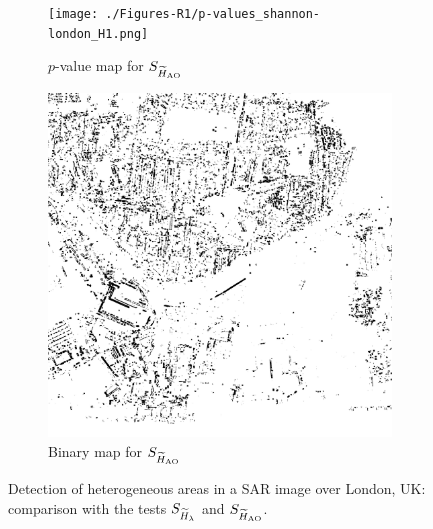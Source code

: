 \documentclass[
  lettersize  journal,
]{IEEEtran}%
\providecommand{\DIFaddtex}[1]{{\protect\color{blue}\uwave{#1}}} %
\providecommand{\DIFaddFL}[1]{\DIFadd{#1}} %
\providecommand{\DIFaddbeginFL}{} %
\providecommand{\DIFaddendFL}{} %
\providecommand{\DIFdelbeginFL}{} %
\providecommand{\DIFdelendFL}{} %
\providecommand{\DIFadd}[1]{\texorpdfstring{\DIFaddtex{#1}}{#1}} %
\newcommand{\DIFscaledelfig}{0.5}
\newlength{\DIFdelgraphicswidth} %
\newlength{\DIFdelgraphicsheight} %
\newcommand{\DIFaddincludegraphics}[2][]{{\color{blue}\fbox{\DIFOincludegraphics[#1]{#2}}}} %
\newcommand{\DIFdelincludegraphics}[2][]{%
\sbox{\DIFdelgraphicsbox}{\DIFOincludegraphics[#1]{#2}}%
\settoboxwidth{\DIFdelgraphicswidth}{\DIFdelgraphicsbox} %
\settoboxtotalheight{\DIFdelgraphicsheight}{\DIFdelgraphicsbox} %
\scalebox{\DIFscaledelfig}{%
\parbox[b]{\DIFdelgraphicswidth}{\usebox{\DIFdelgraphicsbox}\\[-\baselineskip] \rule{\DIFdelgraphicswidth}{0em}}\llap{\resizebox{\DIFdelgraphicswidth}{\DIFdelgraphicsheight}{%
\setlength{\unitlength}{\DIFdelgraphicswidth}%
\begin{picture}(1,1)%
\thicklines\linethickness{2pt} %
{\color[rgb]{1,0,0}\put(0,0){\framebox(1,1){}}}%
{\color[rgb]{1,0,0}\put(0,0){\line( 1,1){1}}}%
{\color[rgb]{1,0,0}\put(0,1){\line(1,-1){1}}}%
\end{picture}%
}\hspace*{3pt}}} %
} %
\DeclareRobustCommand{\DIFaddbeginFL}{\DIFOaddbeginFL \let\includegraphics\DIFaddincludegraphics} %
\DeclareRobustCommand{\DIFaddendFL}{\DIFOaddendFL \let\includegraphics\DIFOincludegraphics} %
\DeclareRobustCommand{\DIFdelbeginFL}{\DIFOdelbeginFL \let\includegraphics\DIFdelincludegraphics} %
\DeclareRobustCommand{\DIFdelendFL}{\DIFOaddendFL \let\includegraphics\DIFOincludegraphics} %
\begin{document}
\begin{figure}[hbt]
\begin{subfigure}{0.18\textwidth}
        \texttt{[image: ./Figures-R1/p-values\_shannon-london\_H1.png]}
        \DIFaddendFL \caption{$p$-value map for $\tiny{S_{\widetilde{H}_{\text{AO}}}}$ }
        \DIFdelbeginFL %
\DIFdelendFL \DIFaddbeginFL \label{fig:london-shann}
    \DIFaddendFL \end{subfigure}
    \DIFdelbeginFL %
\DIFdelendFL \DIFaddbeginFL \DIFaddFL{\hspace{0.00001\textwidth}
    }\begin{subfigure}{0.145\textwidth}
        \includegraphics[width=\linewidth]{./Figures-R1/H_005_london_shannon.png}
        \DIFaddendFL \caption{Binary map for $\small{S_{\widetilde{H}_{\text{AO}}}}$}
        \DIFdelbeginFL %
\DIFdelendFL \DIFaddbeginFL \label{fig:london-005-shann}
    \DIFaddendFL \end{subfigure}
    \caption{Detection of heterogeneous areas in a SAR image over London, UK: comparison with the tests $\small{S_{\widetilde{H}_{\lambda}}}$ and $\small{S_{\widetilde{H}_{\text{AO}}}}$.}
    \label{fig:london}
\end{figure}
\end{document}
